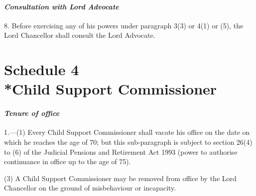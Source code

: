 \documentclass[12pt,a4paper]{article}
\begin{document}
\subsection*{\itshape Consultation with Lord Advocate}

8. Before exercising any of his powers under paragraph 3(3)  or 4(1)
or (5), the Lord Chancellor shall consult the Lord Advocate.


\part[Schedule 4 --- Child Support Commissioners]{Schedule 4\\*Child Support Commissioner}

\renewcommand\parthead{--- Schedule 4}


\subsection*{\itshape Tenure of office}

1.---(1) Every Child Support Commissioner shall vacate his office 
on the date on which he reaches the age of 70; but this sub-paragraph is subject to section 26(4) to (6) of the Judicial Pensions and Retirement Act 1993 (power to authorise continuance in office up to the age of 75).  %


(3) A Child Support Commissioner may be removed from office by the Lord Chancellor on the ground of misbehaviour or incapacity.

\end{document}
